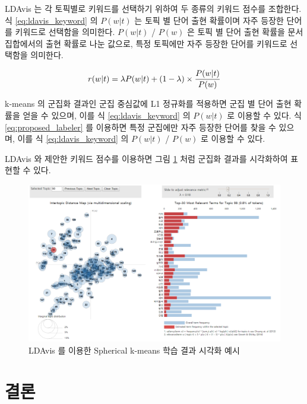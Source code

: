 \documentclass[oneside, ko,phd]{snuthesis_utf8_kor}
\begin{document}
LDAvis 는 각 토픽별로 키워드를 선택하기 위하여 두 종류의 키워드 점수를 조합한다.
식 \ref{eq:ldavis_keyword} 의 $P(w \vert t)$ 는 토픽 별 단어 출현 확률이며 자주 등장한 단어를 키워드로 선택함을 의미한다.
$P(w \vert t)$ / $P(w)$ 은 토픽 별 단어 출현 확률을 문서 집합에서의 출현 확률로 나눈 값으로, 특정 토픽에만 자주 등장한 단어를 키워드로 선택함을 의미한다.

\begin{equation}
\label{eq:ldavis_keyword}
\centering
r(w \vert t) = \lambda P(w \vert t) + (1 - \lambda) \times \frac{P(w \vert t)}{P(w)}
\end{equation}

k-means 의 군집화 결과인 군집 중심값에 L1 정규화를 적용하면 군집 별 단어 출현 확률을 얻을 수 있으며, 이를 식 \ref{eq:ldavis_keyword} 의 $P(w \vert t)$ 로 이용할 수 있다.
식 \ref{eq:proposed_labeler} 를 이용하면 특정 군집에만 자주 등장한 단어를 찾을 수 있으며, 이를 식 \ref{eq:ldavis_keyword} 의 $P(w \vert t)$ / $P(w)$ 로 이용할 수 있다.

LDAvis 와 제안한 키워드 점수를 이용하면 그림 \ref{fig:kmeans_ldavis} 처럼 군집화 결과를 시각화하여 표현할 수 있다.

\begin{figure}[H]
\centering
\includegraphics[keepaspectratio=true, width=0.95\linewidth]{fig/kmeans_visualization.png}
\caption{LDAvis 를 이용한 Spherical k-means 학습 결과 시각화 예시}
\label{fig:kmeans_ldavis}
\end{figure}


\section{결론}
\end{document}
